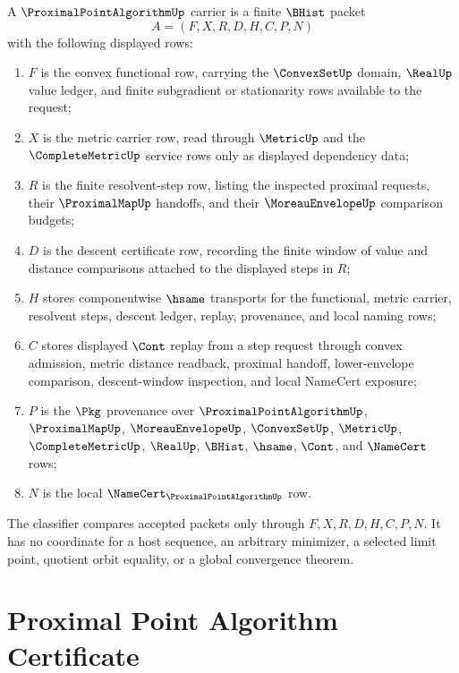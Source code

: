 \begin{definition}
\label{def:proximal-point-algorithm-carrier}
A $\ProximalPointAlgorithmUp$ carrier is a finite $\BHist$ packet
$$
A=(F,X,R,D,H,C,P,N)
$$
with the following displayed rows:
\begin{enumerate}
\item $F$ is the convex functional row, carrying the $\ConvexSetUp$ domain, $\RealUp$ value ledger, and finite subgradient or stationarity rows available to the request;
\item $X$ is the metric carrier row, read through $\MetricUp$ and the $\CompleteMetricUp$ service rows only as displayed dependency data;
\item $R$ is the finite resolvent-step row, listing the inspected proximal requests, their $\ProximalMapUp$ handoffs, and their $\MoreauEnvelopeUp$ comparison budgets;
\item $D$ is the descent certificate row, recording the finite window of value and distance comparisons attached to the displayed steps in $R$;
\item $H$ stores componentwise $\hsame$ transports for the functional, metric carrier, resolvent steps, descent ledger, replay, provenance, and local naming rows;
\item $C$ stores displayed $\Cont$ replay from a step request through convex admission, metric distance readback, proximal handoff, lower-envelope comparison, descent-window inspection, and local NameCert exposure;
\item $P$ is the $\Pkg$ provenance over $\ProximalPointAlgorithmUp$, $\ProximalMapUp$, $\MoreauEnvelopeUp$, $\ConvexSetUp$, $\MetricUp$, $\CompleteMetricUp$, $\RealUp$, $\BHist$, $\hsame$, $\Cont$, and $\NameCert$ rows;
\item $N$ is the local $\NameCert_{\ProximalPointAlgorithmUp}$ row.
\end{enumerate}
The classifier compares accepted packets only through $F,X,R,D,H,C,P,N$. It has no coordinate for a host sequence, an arbitrary minimizer, a selected limit point, quotient orbit equality, or a global convergence theorem.
\end{definition}

\section{Proximal Point Algorithm Certificate}
\label{sec:proximal-point-algorithm-certificate}

